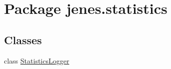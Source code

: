 \hypertarget{namespacejenes_1_1statistics}{\section{Package jenes.\-statistics}
\label{namespacejenes_1_1statistics}
}
\subsection*{Classes}
\begin{DoxyCompactItemize}
\item 
class \hyperlink{classjenes_1_1statistics_1_1_statistics_logger}{Statistics\-Logger}
\end{DoxyCompactItemize}
